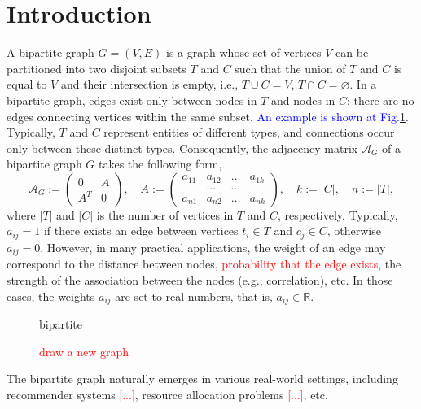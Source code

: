 \documentclass{llncs}
\newcommand{\red}[1]{\textcolor{red}{#1}}
\begin{document}

\section{Introduction}

A bipartite graph $G = (V, E)$ is a graph whose set of vertices $V$ can be partitioned into two disjoint subsets $T$ and $C$ such that the union of $T$ and $C$ is equal to $V$ and their intersection is empty, i.e., $
T \cup C = V$,  $T \cap C = \varnothing$.  In a bipartite graph, edges exist only between nodes in $T$ and nodes in $C$; there are no edges connecting vertices within the same subset. \textcolor{blue}{An example is shown at Fig.\ref{fig:nice_name}.} Typically, $T$ and $C$ represent entities of different types, and connections occur only between these distinct types. Consequently, the adjacency matrix $\mathcal{A}_G$ of a bipartite graph $G$ takes the following form,
\begin{equation}
\label{eq:adj_matrix}
\mathcal{A}_G := \begin{pmatrix}
0 & A\\
A^{T} & 0
\end{pmatrix},
\quad
A := \begin{pmatrix}
a_{11} & a_{12} & \dots & a_{1k} \\
 &\cdots & \cdots & \\
a_{n1} & a_{n2} & \dots & a_{nk}
\end{pmatrix},
\quad k := |C|, \quad
n := |T|,
\end{equation}
where $|T|$ and $|C|$ is the number of vertices in $T$ and $C$, respectively. Typically, $a_{ij} = 1$ if there exists an edge between vertices $t_i\in T$ and $c_{j}\in C$, otherwise $a_{ij} = 0$. However, in many practical applications, the weight of an edge may correspond to the distance between nodes, \textcolor{red}{probability that the edge exists}, the strength of the association between the nodes (e.g., correlation), etc. In those cases, the weights $a_{ij}$ are set to real numbers, that is, $a_{ij}\in 
\mathbb{R}$. 

\begin{figure}
 \centering
 {bipartite}
 \caption{\red{draw a new graph}}
 \label{fig:nice_name}
\end{figure}

The bipartite graph naturally emerges in various real-world settings, including recommender systems \textcolor{red}{[...]}, 
resource allocation problems \textcolor{red}{[...]}, etc.
\end{document}
